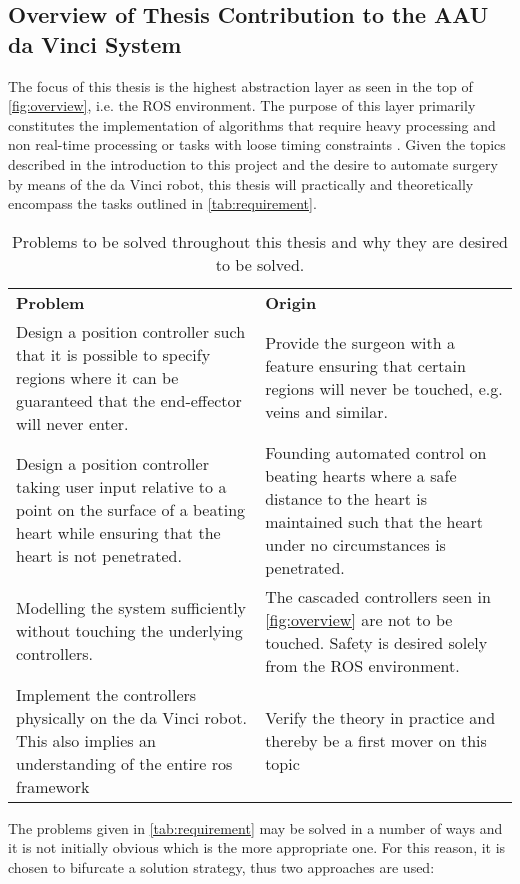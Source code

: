 \subsection{Overview of Thesis Contribution to the AAU da Vinci System}\label{sec:project_overview}
The focus of this thesis is the highest abstraction layer as seen in the top of \autoref{fig:overview}, i.e. the ROS environment. The purpose of this layer primarily constitutes the implementation of algorithms that require heavy processing and non real-time processing or tasks with loose timing constraints \citep{bib:robot_paper}.
Given the topics described in the introduction to this project and the desire to automate surgery by means of the da Vinci robot, this thesis will practically and theoretically encompass the tasks outlined in \autoref{tab:requirement}.
\begin{table}[H]
\begin{tabularx}{\textwidth}{X X}
\rowcolor{HeaderBlue} 
\textbf{Problem} &  \textbf{Origin}\\
Design a position controller such that it is possible to specify regions where it can be guaranteed that the end-effector will never enter. & Provide the surgeon with a feature ensuring that certain regions will never be touched, e.g. veins and similar. \\
\rowcolor{textBlue} 
Design a position controller taking  user input relative to a point on the surface of a beating heart while ensuring that the heart is not penetrated. & Founding automated control on beating hearts where a safe distance to the heart is maintained such that the heart under no circumstances is penetrated.\\
Modelling the system sufficiently without touching the underlying controllers. & The cascaded controllers seen in \autoref{fig:overview} are not to be touched. Safety is desired solely from the ROS environment. \\
\rowcolor{textBlue} 
Implement the controllers physically on the da Vinci robot. This also implies an understanding of the entire \gls{ros} framework & Verify the theory in practice and thereby be a first mover on this topic \\
\end{tabularx}
	\caption{Problems to be solved throughout this thesis and why they are desired to be solved.}
\label{tab:requirement}
\end{table}
The problems given in \autoref{tab:requirement} may be solved in a number of ways and it is not initially obvious which is the more appropriate one. For this reason, it is chosen to bifurcate a solution strategy, thus two approaches are used:

